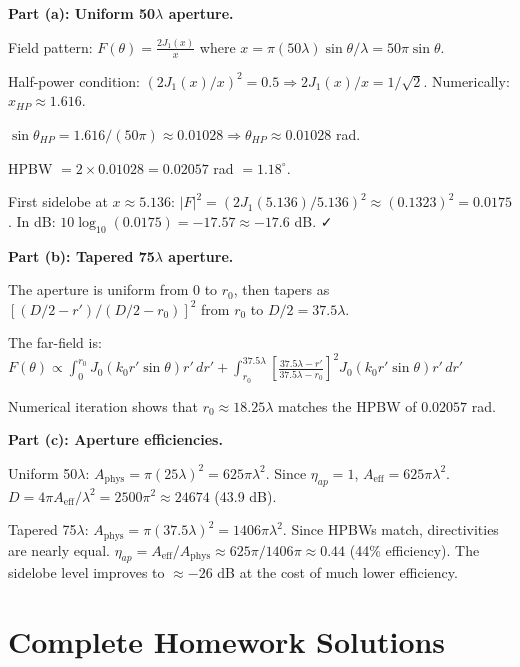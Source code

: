 \documentclass[10pt,letterpaper]{article}
\newcommand{\Aeff}{A_{\mathrm{eff}}}
\newcommand{\Aphys}{A_{\mathrm{phys}}}
\newcommand{\degrees}{^{\circ}}
\begin{document}
\begin{tcolorbox}[examplebox, title={Full Solution}]
\textbf{Part (a): Uniform 50$\lambda$ aperture.}

Field pattern: $F(\theta) = \frac{2J_1(x)}{x}$ where $x = \pi(50\lambda)\sin\theta/\lambda = 50\pi\sin\theta$.

Half-power condition: $(2J_1(x)/x)^2 = 0.5 \Rightarrow 2J_1(x)/x = 1/\sqrt{2}$. Numerically: $x_{HP} \approx 1.616$.

$\sin\theta_{HP} = 1.616/(50\pi) \approx 0.01028 \Rightarrow \theta_{HP} \approx 0.01028$ rad.

HPBW $= 2\times0.01028 = 0.02057$ rad $= 1.18\degrees$.

First sidelobe at $x\approx5.136$: $|F|^2 = (2J_1(5.136)/5.136)^2 \approx (0.1323)^2 = 0.0175$. In dB: $10\log_{10}(0.0175) = -17.57\approx-17.6$ dB. ✓

\textbf{Part (b): Tapered 75$\lambda$ aperture.}

The aperture is uniform from $0$ to $r_0$, then tapers as $[(D/2-r')/(D/2-r_0)]^2$ from $r_0$ to $D/2 = 37.5\lambda$.

The far-field is: $F(\theta)\propto\int_0^{r_0}J_0(k_0 r'\sin\theta)r'\,dr' + \int_{r_0}^{37.5\lambda}\left[\frac{37.5\lambda-r'}{37.5\lambda-r_0}\right]^2J_0(k_0 r'\sin\theta)r'\,dr'$

Numerical iteration shows that $r_0\approx18.25\lambda$ matches the HPBW of $0.02057$ rad.

\textbf{Part (c): Aperture efficiencies.}

Uniform 50$\lambda$: $\Aphys = \pi(25\lambda)^2 = 625\pi\lambda^2$. Since $\eta_{ap}=1$, $\Aeff = 625\pi\lambda^2$. $D = 4\pi\Aeff/\lambda^2 = 2500\pi^2 \approx 24674$ (43.9 dB).

Tapered 75$\lambda$: $\Aphys = \pi(37.5\lambda)^2 = 1406\pi\lambda^2$. Since HPBWs match, directivities are nearly equal. $\eta_{ap} = \Aeff/\Aphys \approx 625\pi/1406\pi \approx 0.44$ (44\% efficiency). The sidelobe level improves to $\approx -26$ dB at the cost of much lower efficiency.
\end{tcolorbox}

\section{Complete Homework Solutions}
\end{document}
